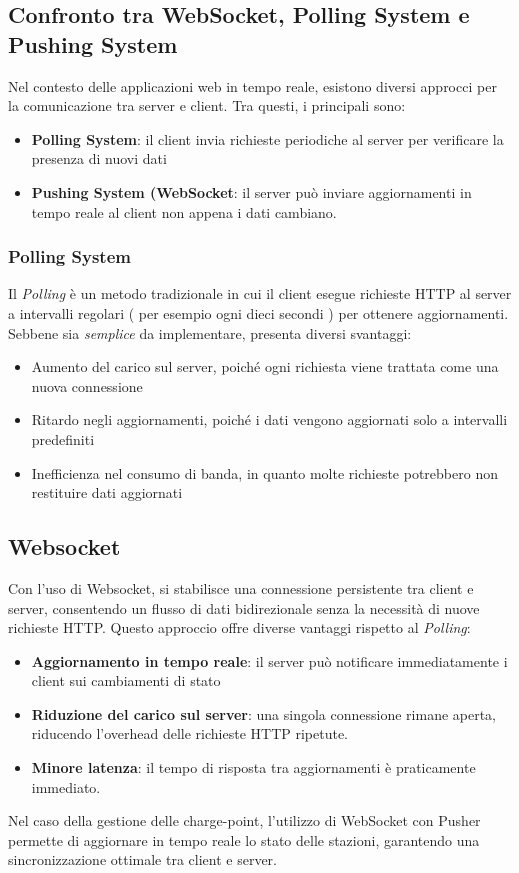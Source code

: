 \subsection{Confronto tra WebSocket, Polling System e Pushing System}
Nel contesto delle applicazioni web in tempo reale, esistono diversi approcci per la comunicazione tra server e client. Tra questi, i principali sono:
\begin{itemize}
\item \textbf{Polling System}: il client invia richieste periodiche al server per verificare la presenza di nuovi dati
\item \textbf{Pushing System (WebSocket}: il server può inviare aggiornamenti in tempo reale al client non appena i dati cambiano.
\end{itemize}

\subsubsection{Polling System}
Il \textit{Polling} è un metodo tradizionale in cui il client esegue richieste HTTP al server a intervalli regolari ( per esempio ogni dieci secondi ) per ottenere aggiornamenti. Sebbene sia \textit{semplice} da implementare, presenta diversi svantaggi:
\begin{itemize}
\item Aumento del carico sul server, poiché ogni richiesta viene trattata come una nuova connessione
\item Ritardo negli aggiornamenti, poiché i dati vengono aggiornati solo a intervalli predefiniti
\item Inefficienza nel consumo di banda, in quanto molte richieste potrebbero non restituire dati aggiornati
\end{itemize}

\subsection{Websocket}
Con l'uso di Websocket, si stabilisce una connessione persistente tra client e server, consentendo un flusso di dati bidirezionale senza la necessità di nuove richieste HTTP. Questo approccio offre diverse vantaggi rispetto al \textit{Polling}:
\begin{itemize}
\item \textbf{Aggiornamento in tempo reale}: il server può notificare immediatamente i client sui cambiamenti di stato
\item \textbf{Riduzione del carico sul server}: una singola connessione rimane aperta, riducendo l'overhead delle richieste HTTP ripetute.
\item \textbf{Minore latenza}: il tempo di risposta tra aggiornamenti è praticamente immediato.
\end{itemize}
Nel caso della gestione delle charge-point, l'utilizzo di WebSocket con Pusher permette di aggiornare in tempo reale lo stato delle stazioni, garantendo una sincronizzazione ottimale tra client e server.

